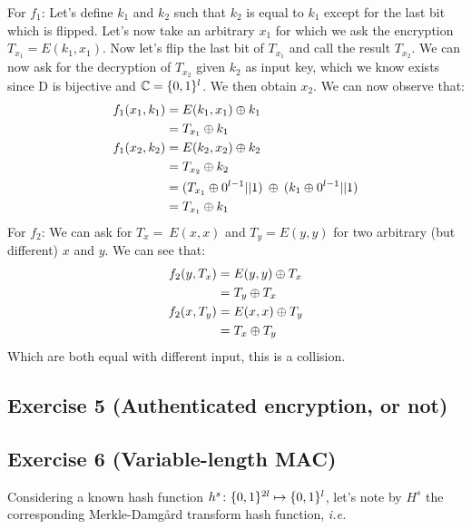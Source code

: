 \begin{solution}
	For $f_1$: Let's define $k_1$ and $k_2$ such that $k_2$ is equal to $k_1$ except for the last bit which is flipped. Let's now take an arbitrary $x_1$ for which we ask the encryption $T_{x_1} = E(k_1,x_1)$. Now let's flip the last bit of $T_{x_1}$ and call the result $T_{x_2}$. We can now ask for the decryption of $T_{x_2}$ given $k_2$ as input key, which we know exists since D is bijective and $\mathbb{C} = \{0, 1\}^{l}$. We then obtain $x_2$. We can now observe that:
	\begin{align*}
	f_1(x_1, k_1) & = E(k_1,x_1) \oplus k_1\\
	& = T_{x_1}  \oplus k_1\\
	f_1(x_2, k_2) & = E(k_2,x_2) \oplus k_2\\
	& = T_{x_2} \oplus k_2\\
	& = (T_{x_1} \oplus 0^{l-1}||1 )\:\oplus\: (k_1 \oplus 0^{l-1}||1)\\
	& = T_{x_1}  \oplus k_1
	\end{align*}
	For $f_2$: We can ask for $T_x = \:E(x,x)$ and $T_y = E(y,y)$ for two arbitrary (but different) $x$ and $y$.  We can see that:
	\begin{align*}
	f_2(y, T_x) & = E(y,y) \oplus T_x\\
	& = T_y  \oplus T_x\\
	f_2(x, T_y) & = E(x,x) \oplus T_y\\
	& = T_x \oplus T_y
	\end{align*}
	Which are both equal with different input, this is a collision.
\end{solution}



\subsection{Exercise 5 (Authenticated encryption, or not)}




\subsection{Exercise 6 (Variable-length MAC)}

Considering a known hash function $h^s\colon\{0, 1\}^{2l}\mapsto\{0, 1\}^{l}$,
let's note by $H^s$ the corresponding Merkle-Damg{\aa}rd transform hash function,
\emph{i.e.}

